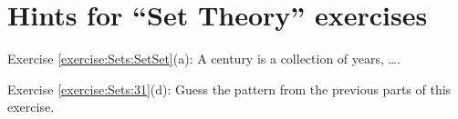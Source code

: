 \section{Hints for ``Set Theory'' exercises}
\label{sec:Sets:Hints}

\noindent Exercise \ref{exercise:Sets:SetSet}(a): A century is a collection of years, \ldots.

\noindent Exercise \ref{exercise:Sets:31}(d): Guess the pattern from the previous parts of this exercise.
